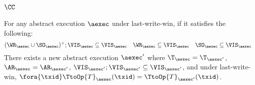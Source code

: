 \subsection{\( \CC \)}

\begin{lemma}
    \label{lem:aexec-spec-cc}
    For any abstract execution \( \aexec \) under last-write-win, if it satisfies the following:
    \[
        (\WR_\aexec \cup \SO_\aexec)^{+} ; \VIS_\aexec \subseteq \VIS_\aexec \quad \WR_\aexec \subseteq \VIS_\aexec \quad \SO_\aexec \subseteq \VIS_\aexec
    \]
    There exists a new abstract execution \( \aexec' \) where \( \T_\aexec = \T_{\aexec'} \), \( \AR_\aexec = \AR_{\aexec'} \),
    \( \VIS_{\aexec'} ; \VIS_{\aexec'} \subseteq \VIS_{\aexec'} \), and
    under last-write-win, \( \fora{\txid} \TtoOp{T}_{\aexec}(\txid) = \TtoOp{T}_{\aexec'}(\txid) \).
\end{lemma}
